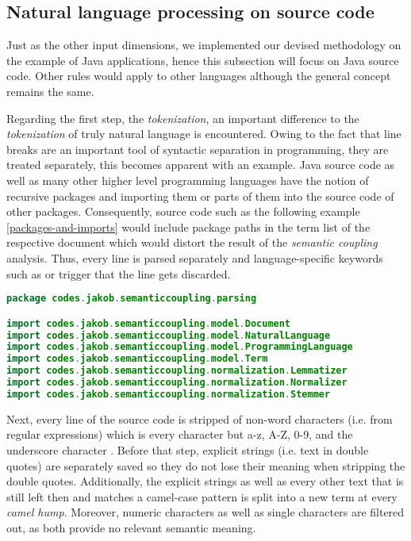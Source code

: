\documentclass[12pt,a4paper]{report}
\begin{document}
\subsection{Natural language processing on source code}

Just as the other input dimensions, we implemented our devised methodology
on the example of Java applications, hence this subsection will focus on
Java source code. Other rules would apply to other languages although
the general concept remains the same.

Regarding the first step, the \textit{tokenization}, an important difference to
the \textit{tokenization} of truly natural language is encountered.
Owing to the fact that line breaks are an important tool of syntactic separation
in programming, they are treated separately, this becomes apparent with an example.
Java source code as well as many other higher level programming languages have
the notion of recursive packages and importing them or parts of them into the
source code of other packages.
Consequently, source code such as the following example \ref{packages-and-imports}
would include package paths in the term list of the respective document
which would distort the result of the \textit{semantic coupling} analysis.
Thus, every line is parsed separately and language-specific keywords such as
 or  trigger that the line gets discarded.

\begin{lstlisting}[caption=Packages and imports in Java, label=packages-and-imports, language=Java, breaklines=true]
package codes.jakob.semanticcoupling.parsing

import codes.jakob.semanticcoupling.model.Document
import codes.jakob.semanticcoupling.model.NaturalLanguage
import codes.jakob.semanticcoupling.model.ProgrammingLanguage
import codes.jakob.semanticcoupling.model.Term
import codes.jakob.semanticcoupling.normalization.Lemmatizer
import codes.jakob.semanticcoupling.normalization.Normalizer
import codes.jakob.semanticcoupling.normalization.Stemmer
\end{lstlisting}

Next, every line of the source code is stripped of non\hyp word characters
(i.e.  from regular expressions) which is every character
but a-z, A-Z, 0-9, and the underscore character \cite{ieee1992posix}.
Before that step, explicit strings (i.e. text in double quotes) are separately
saved so they do not lose their meaning when stripping the double quotes.
Additionally, the explicit strings as well as every other text that is still
left then and matches a camel-case pattern is split into a new term at every
\textit{camel hump}. Moreover, numeric characters as well as single characters
are filtered out, as both provide no relevant semantic meaning.
\end{document}
